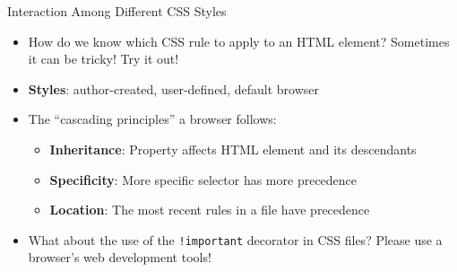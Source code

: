 \documentclass[14pt,aspectratio=169]{beamer}
\begin{document}
%
\begin{frame}{Interaction Among Different CSS Styles}
  \begin{itemize}
    \item How do we know which CSS rule to apply to an HTML element? Sometimes
      it can be tricky! Try it out!
      \vspace*{-.2in}
    \item {\bf Styles}: author-created, user-defined, default browser
      \vspace*{-.15in}
    \item The ``cascading principles'' a browser follows:
      \begin{itemize}
        \item {\bf Inheritance}: Property affects HTML element and its
          descendants
        \item {\bf Specificity}: More specific selector has more precedence
        \item {\bf Location}: The most recent rules in a file have precedence
      \end{itemize}
      \vspace*{-.2in}
    \item What about the use of the {\tt !important} decorator in CSS files?
      Please use a browser's web development tools!
  \end{itemize}
\end{frame}
\end{document}
